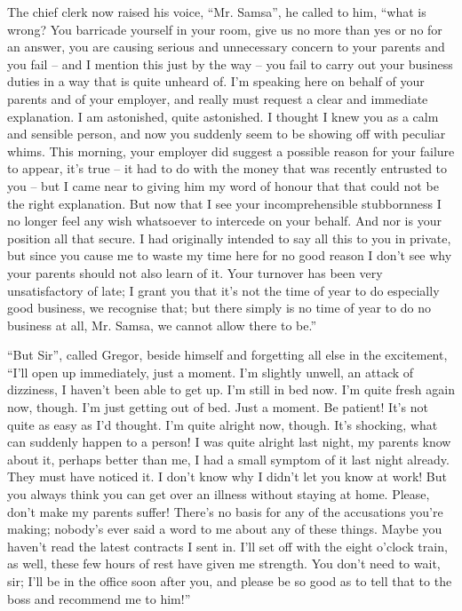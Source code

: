 The chief clerk now raised his voice, “Mr. Samsa”, he called to him,
“what is wrong? You barricade yourself in your room, give us no more
than yes or no for an answer, you are causing serious and unnecessary
concern to your parents and you fail – and I mention this just by the
way – you fail to carry out your business duties in a way that is quite
unheard of. I’m speaking here on behalf of your parents and of your
employer, and really must request a clear and immediate explanation. I
am astonished, quite astonished. I thought I knew you as a calm and
sensible person, and now you suddenly seem to be showing off with
peculiar whims. This morning, your employer did suggest a possible
reason for your failure to appear, it’s true – it had to do with the
money that was recently entrusted to you – but I came near to giving him
my word of honour that that could not be the right explanation. But now
that I see your incomprehensible stubbornness I no longer feel any wish
whatsoever to intercede on your behalf. And nor is your position all
that secure. I had originally intended to say all this to you in
private, but since you cause me to waste my time here for no good
reason I don’t see why your parents should not also learn of it. Your
turnover has been very unsatisfactory of late; I grant you that it’s
not the time of year to do especially good business, we recognise that;
but there simply is no time of year to do no business at all, Mr.
Samsa, we cannot allow there to be.”

“But Sir”, called Gregor, beside himself and forgetting all else in the
excitement, “I’ll open up immediately, just a moment. I’m slightly
unwell, an attack of dizziness, I haven’t been able to get up. I’m
still in bed now. I’m quite fresh again now, though. I’m just getting
out of bed. Just a moment. Be patient! It’s not quite as easy as I’d
thought. I’m quite alright now, though. It’s shocking, what can
suddenly happen to a person! I was quite alright last night, my parents
know about it, perhaps better than me, I had a small symptom of it last
night already. They must have noticed it. I don’t know why I didn’t let
you know at work! But you always think you can get over an illness
without staying at home. Please, don’t make my parents suffer! There’s
no basis for any of the accusations you’re making; nobody’s ever said a
word to me about any of these things. Maybe you haven’t read the latest
contracts I sent in. I’ll set off with the eight o’clock train, as
well, these few hours of rest have given me strength. You don’t need to
wait, sir; I’ll be in the office soon after you, and please be so good
as to tell that to the boss and recommend me to him!”

